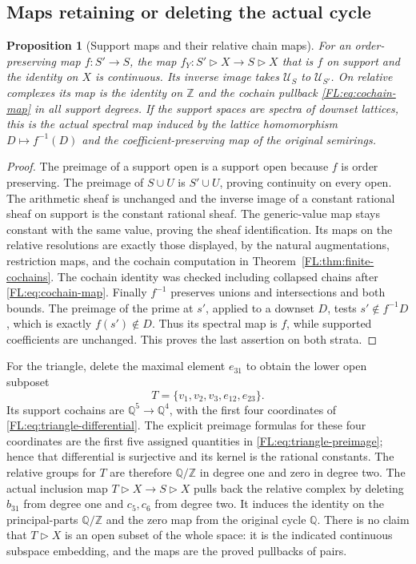 \documentclass[11pt,a4paper]{article}
\newtheorem{proposition}[theorem]{Proposition}
\theoremstyle{definition}\newtheorem{definition}[theorem]{Definition}
\providecommand{\RQ}{\mathbb Q}
\begin{document}
\subsection{Maps retaining or deleting the actual cycle}

\begin{proposition}[Support maps and their relative chain maps]
\label{FL:prop:support-morphisms}
For an order-preserving map $f:S'\to S$, the map
$f_Y:S'\triangleright X\to S\triangleright X$ that is $f$ on support
and the identity on $X$ is continuous. Its inverse image takes
$\mathcal U_S$ to $\mathcal U_{S'}$. On relative complexes its map is
the identity on $\mathbb Z$ and the cochain pullback
\eqref{FL:eq:cochain-map} in all support degrees. If the support spaces
are spectra of downset lattices, this is the actual spectral map
induced by the lattice homomorphism $D\mapsto f^{-1}(D)$ and the
coefficient-preserving map of the original semirings.
\end{proposition}
\begin{proof}
The preimage of a support open is a support open because $f$ is
order preserving. The preimage of $S\cup U$ is $S'\cup U$, proving
continuity on every open. The arithmetic sheaf is unchanged and
the inverse image of a constant rational sheaf on support is the
constant rational sheaf. The generic-value map stays constant with
the same value, proving the sheaf identification. Its maps on the
relative resolutions are exactly those displayed, by the natural
augmentations, restriction maps, and the cochain computation in
Theorem~\ref{FL:thm:finite-cochains}. The cochain identity was checked
including collapsed chains after \eqref{FL:eq:cochain-map}.
Finally $f^{-1}$ preserves unions and intersections and both bounds.
The preimage of the prime at $s'$, applied to a downset $D$, tests
$s'\notin f^{-1}D$, which is exactly $f(s')\notin D$. Thus its
spectral map is $f$, while supported coefficients are unchanged.
This proves the last assertion on both strata.
\end{proof}

For the triangle, delete the maximal element $e_{31}$ to obtain the
lower open subposet
\[
 T=\{v_1,v_2,v_3,e_{12},e_{23}\}.
\]
Its support cochains are $\RQ^5\to\RQ^4$, with the first four
coordinates of \eqref{FL:eq:triangle-differential}. The explicit
preimage formulas for these four coordinates are the first five
assigned quantities in \eqref{FL:eq:triangle-preimage}; hence that
differential is surjective and its kernel is the rational constants.
The relative groups for $T$ are therefore $\RQ/\mathbb Z$ in degree
one and zero in degree two. The actual inclusion map
$T\triangleright X\to S\triangleright X$ pulls back the relative
complex by deleting $b_{31}$ from degree one and $c_5,c_6$ from
degree two. It induces the identity on the principal-parts
$\RQ/\mathbb Z$ and the zero map from the original cycle $\RQ$.
There is no claim that $T\triangleright X$ is an open subset of the
whole space: it is the indicated continuous subspace embedding,
and the maps are the proved pullbacks of pairs.
\end{document}
